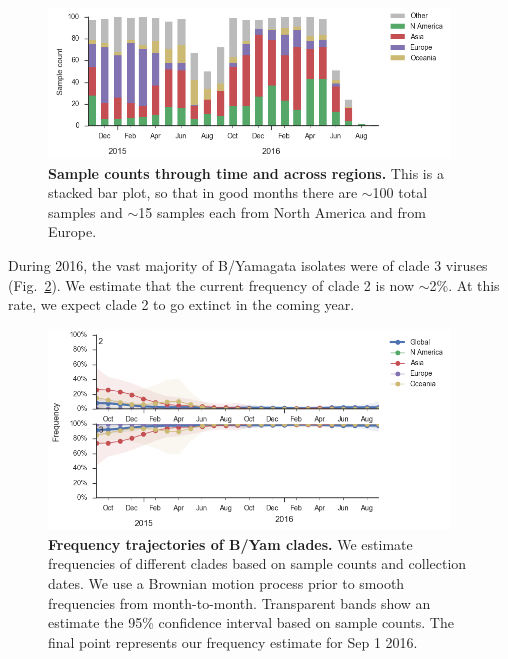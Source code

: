 \documentclass[11pt,oneside,letterpaper]{article}
\begin{document}
\begin{figure}[H]
	\centering
	\includegraphics[width=0.95\textwidth]{../figures/sep-2016/Yam_counts.png}
	\caption{\textbf{Sample counts through time and across regions.}
	This is a stacked bar plot, so that in good months there are $\sim$100 total samples and $\sim$15 samples each from North America and from Europe.
	}
	\label{Yam_counts}
\end{figure}

\pagebreak

During 2016, the vast majority of B/Yamagata isolates were of clade 3 viruses (Fig.\ \ref{Yam_clades}). We estimate that the current frequency of clade 2 is now $\sim$2\%. At this rate, we expect clade 2 to go extinct in the coming year.

\begin{figure}[H]
	\centering
	\includegraphics[width=0.95\textwidth]{../figures/sep-2016/Yam_clades.png}
	\caption{\textbf{Frequency trajectories of B/Yam clades.}
	We estimate frequencies of different clades based on sample counts and collection dates.
	We use a Brownian motion process prior to smooth frequencies from month-to-month.
	Transparent bands show an estimate the 95\% confidence interval based on sample counts.
	The final point represents our frequency estimate for Sep 1 2016.
	}
	\label{Yam_clades}
\end{figure}

\pagebreak
\end{document}
